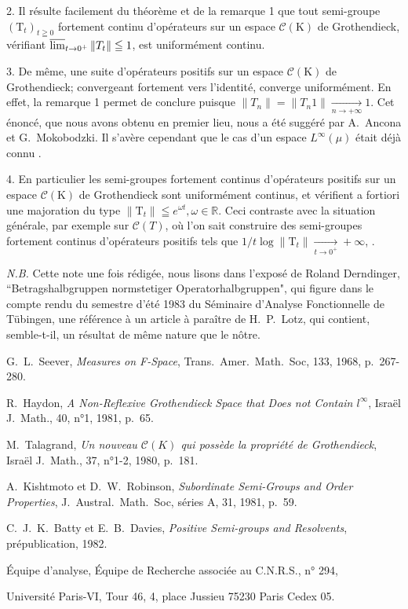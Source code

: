 \documentclass{article}
\theoremstyle{plain}
\begin{document}
2. Il résulte facilement du théorème et de la remarque 1 que tout semi-groupe $\left(\mathrm{T}_{t}\right)_{t \geqq 0}$ fortement continu d'opérateurs sur un espace $\mathscr{C}(\mathrm{K})$ de Grothendieck, vérifiant $\varlimsup_{t \rightarrow 0^{+}}\left\|T_{t}\right\| \leqq 1$, est uniformément continu.

3. De même, une suite d'opérateurs positifs sur un espace $\mathscr{C}(\mathrm{K})$ de Grothendieck; convergeant fortement vers l'identité, converge uniformément. En effet, la remarque 1 permet de conclure puisque $\left\|T_{n}\right\|=\left\|T_{n} 1\right\| \underset{n \rightarrow+\infty}{\longrightarrow} 1$. Cet énoncé, que nous avons obtenu en premier lieu, nous a été suggéré par A.\ Ancona et G.\ Mokobodzki. Il s'avère cependant que le cas d'un espace $L^{\infty}(\mu)$ était déjà connu \cite{4}.

4. En particulier les semi-groupes fortement continus d'opérateurs positifs sur un espace $\mathscr{C}(\mathrm{K})$ de Grothendieck sont uniformément continus, et vérifient a fortiori une majoration du type $\left\|\mathrm{T}_{t}\right\| \leqq e^{\omega t}, \omega \in \mathbb{R}$. Ceci contraste avec la situation générale, par exemple sur $\mathscr{C}(T)$, où l'on sait construire des semi-groupes fortement continus d'opérateurs positifs tels que $1 / t \log \left\|\mathrm{T}_{t}\right\| \underset{t\to0^+}{\longrightarrow} +\infty$, \cite{5}.

\bigskip

\emph{N.B.} Cette note une fois rédigée, nous lisons dans l'exposé de Roland Derndinger, ``Betragshalbgruppen normstetiger Operatorhalbgruppen", qui figure dans le compte rendu du semestre d'été 1983 du Séminaire d'Analyse Fonctionnelle de Tübingen, une référence à un article à paraître de H.\ P.\ Lotz, qui contient, semble-t-il, un résultat de même nature que le nôtre.

\renewcommand{\refname}{Références bibliographiques}
\begin{thebibliography}{1}
	
	 G.\ L.\ Seever, \emph{Measures on F-Space}, Trans.\ Amer.\ Math.\ Soc, 133, 1968, p.\ 267-280.
	
	 R.\ Haydon, \emph{A Non-Reflexive Grothendieck Space that Does not Contain $l^\infty$}, Israël J.\ Math., 40, n°1,
	1981, p.\ 65.
	
	 M.\ Talagrand, \emph{Un nouveau $\mathscr{C}(K)$ qui possède la propriété de Grothendieck}, Israël J.\ Math., 37, n°1-2,
	1980, p.\ 181. 

	 A.\ Kishtmoto et D.\ W.\ Robinson, \emph{Subordinate Semi-Groups and Order Properties}, J.\ Austral.\ Math.\
	Soc, séries A, 31, 1981, p.\ 59.
	
	 C.\ J.\ K.\ Batty et E.\ B.\ Davies, \emph{Positive Semi-groups and Resolvents}, prépublication, 1982.
\end{thebibliography}

\begin{flushright}
	Équipe d'analyse, Équipe de Recherche associée au C.N.R.S., n° 294,
	
	Université Paris-VI, Tour 46, 4, place Jussieu 75230 Paris Cedex 05.
\end{flushright}
\end{document}
